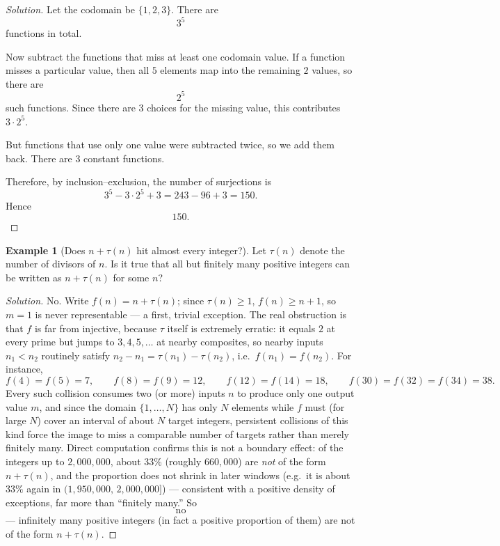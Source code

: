 \documentclass[11pt]{article}
\theoremstyle{definition}
\newtheorem{example}{Example}[section]
\begin{document}
\begin{proof}[Solution]
Let the codomain be $\{1,2,3\}$. There are
\[
3^5
\]
functions in total.

Now subtract the functions that miss at least one codomain value. If a function misses a particular value, then all $5$ elements map into the remaining $2$ values, so there are
\[
2^5
\]
such functions. Since there are $3$ choices for the missing value, this contributes $3\cdot 2^5$.

But functions that use only one value were subtracted twice, so we add them back. There are $3$ constant functions.

Therefore, by inclusion--exclusion, the number of surjections is
\[
3^5-3\cdot 2^5+3=243-96+3=150.
\]
Hence
\[
\boxed{150}.
\]
\end{proof}

\begin{example}[Does $n+\tau(n)$ hit almost every integer?]
Let $\tau(n)$ denote the number of divisors of $n$. Is it true that all but finitely many positive integers can be written as $n+\tau(n)$ for some $n$?
\end{example}

\begin{proof}[Solution]
No. Write $f(n)=n+\tau(n)$; since $\tau(n)\ge1$, $f(n)\ge n+1$, so $m=1$ is never representable — a first, trivial exception. The real obstruction is that $f$ is far from injective, because $\tau$ itself is extremely erratic: it equals $2$ at every prime but jumps to $3,4,5,\dots$ at nearby composites, so nearby inputs $n_1<n_2$ routinely satisfy $n_2-n_1=\tau(n_1)-\tau(n_2)$, i.e.\ $f(n_1)=f(n_2)$. For instance,
\[
f(4)=f(5)=7, \qquad f(8)=f(9)=12, \qquad f(12)=f(14)=18, \qquad f(30)=f(32)=f(34)=38.
\]
Every such collision consumes two (or more) inputs $n$ to produce only one output value $m$, and since the domain $\{1,\dots,N\}$ has only $N$ elements while $f$ must (for large $N$) cover an interval of about $N$ target integers, persistent collisions of this kind force the image to miss a comparable number of targets rather than merely finitely many. Direct computation confirms this is not a boundary effect: of the integers up to $2{,}000{,}000$, about $33\%$ (roughly $660{,}000$) are \emph{not} of the form $n+\tau(n)$, and the proportion does not shrink in later windows (e.g.\ it is about $33\%$ again in $(1{,}950{,}000,\,2{,}000{,}000]$) — consistent with a positive density of exceptions, far more than ``finitely many.'' So
\[
\boxed{\text{no}}
\]
— infinitely many positive integers (in fact a positive proportion of them) are not of the form $n+\tau(n)$.
\end{proof}
\end{document}
